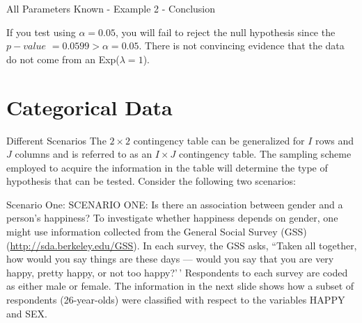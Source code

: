 \documentclass[
  ignorenonframetext,
]{beamer}
\begin{document}
\begin{frame}{All Parameters Known - Example 2 - Conclusion}
\protect\hypertarget{all-parameters-known---example-2---conclusion}{}
\begin{tcolorbox}
If you test using $\alpha = 0.05$, you will fail to reject the null hypothesis since the $p-value$ $= 0.0599 > \alpha = 0.05$.  There is not convincing evidence that the data do not come from an Exp($\lambda = 1$).
\end{tcolorbox}
\end{frame}

\hypertarget{categorical-data}{%
\section{Categorical Data}\label{categorical-data}}

\begin{frame}{Different Scenarios}
\protect\hypertarget{different-scenarios}{}
The \(2 \times 2\) contingency table can be generalized for \(I\) rows
and \(J\) columns and is referred to as an \(I \times J\) contingency
table. The sampling scheme employed to acquire the information in the
table will determine the type of hypothesis that can be tested. Consider
the following two scenarios:
\end{frame}

\begin{frame}{Scenario One:}
\protect\hypertarget{scenario-one}{}
SCENARIO ONE: Is there an association between gender and a person's
happiness? To investigate whether happiness depends on gender, one might
use information collected from the General Social Survey (GSS)
(\href{http://sda.berkeley.edu/GSS}{http://sda.berkeley.edu/GSS}). In
each survey, the GSS asks, ``Taken all together, how would you say
things are these days --- would you say that you are very happy, pretty
happy, or not too happy?'\,' Respondents to each survey are coded as
either male or female. The information in the next slide shows how a
subset of respondents (26-year-olds) were classified with respect to the
variables HAPPY and SEX.
\end{frame}
\end{document}
